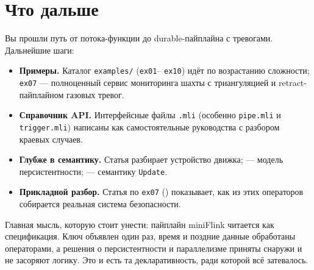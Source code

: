 \documentclass[11pt,a4paper]{article}
\begin{document}
\section{Что дальше}

Вы прошли путь от потока-функции до durable-пайплайна с тревогами.
Дальнейшие шаги:

\begin{itemize}
\item \textbf{Примеры.} Каталог \texttt{examples/} (\texttt{ex01}--%
  \texttt{ex10}) идёт по возрастанию сложности; \texttt{ex07} ---
  полноценный сервис мониторинга шахты с триангуляцией и
  retract-пайплайном газовых тревог.
\item \textbf{Справочник API.} Интерфейсные файлы \texttt{.mli}
  (особенно \texttt{pipe.mli} и \texttt{trigger.mli}) написаны как
  самостоятельные руководства с разбором краевых случаев.
\item \textbf{Глубже в семантику.} Статья 
  разбирает устройство движка; 
  --- модель персистентности;  ---
  семантику \texttt{Update}.
\item \textbf{Прикладной разбор.} Статья по \texttt{ex07}
  () показывает, как из этих операторов
  собирается реальная система безопасности.
\end{itemize}

Главная мысль, которую стоит унести: пайплайн miniFlink читается как
спецификация. Ключ объявлен один раз, время и поздние данные обработаны
операторами, а решения о персистентности и параллелизме приняты
снаружи и не засоряют логику. Это и есть та декларативность, ради
которой всё затевалось.
\end{document}
